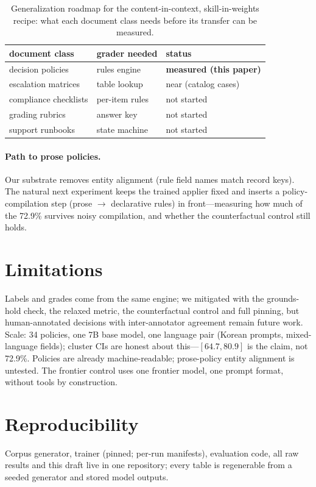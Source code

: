\documentclass[11pt]{article}
\begin{document}
\begin{table}[t]\footnotesize
  \centering
  \begin{tabular}{@{}p{2.1cm}p{2.4cm}p{2.2cm}@{}}
    \toprule
    document class & grader needed & status \\
    \midrule
    decision policies & rules engine & \textbf{measured (this paper)} \\
    escalation matrices & table lookup & near (catalog cases) \\
    compliance checklists & per-item rules & not started \\
    grading rubrics & answer key & not started \\
    support runbooks & state machine & not started \\
    \bottomrule
  \end{tabular}
  \caption{Generalization roadmap for the content-in-context, skill-in-weights recipe: what each document class needs before its transfer can be measured.}
  \label{tab:roadmap}
\end{table}

\paragraph{Path to prose policies.} Our substrate removes entity alignment (rule field names match record keys). The natural next experiment keeps the trained applier fixed and inserts a policy-compilation step (prose $\rightarrow$ declarative rules) in front---measuring how much of the 72.9\% survives noisy compilation, and whether the counterfactual control still holds.

\section*{Limitations}
Labels and grades come from the same engine; we mitigated with the grounds-hold check, the relaxed metric, the counterfactual control and full pinning, but human-annotated decisions with inter-annotator agreement remain future work. Scale: 34 policies, one 7B base model, one language pair (Korean prompts, mixed-language fields); cluster CIs are honest about this---$[64.7, 80.9]$ is the claim, not 72.9\%. Policies are already machine-readable; prose-policy entity alignment is untested. The frontier control uses one frontier model, one prompt format, without tools by construction.

\section*{Reproducibility}
Corpus generator, trainer (pinned; per-run manifests), evaluation code, all raw results and this draft live in one repository; every table is regenerable from a seeded generator and stored model outputs.


\end{document}
